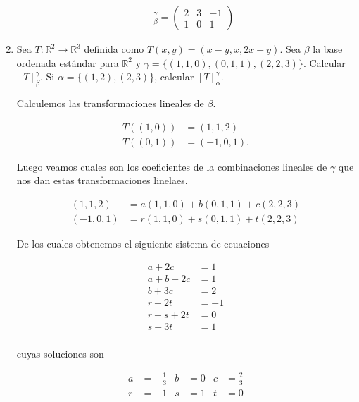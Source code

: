 \documentclass[10pt,a4paper]{article}
\theoremstyle{definition}
\newcommand{\R}{\mathbb{R}}
\begin{document}
\begin{enumerate}
\begin{enumerate}
        \begin{align*}
            [T]^\gamma_\beta = \begin{pmatrix}
                2 & 3 & -1\\
                1 & 0 & 1
            \end{pmatrix}
        \end{align*}
 
    \end{enumerate}

    \item Sea $T : \R^2 \rightarrow \R^3$ definida como $T(x, y) = (x - y, x, 2x + y)$. Sea $\beta$ la base ordenada estándar para $\R^2$ y $\gamma = \{(1, 1, 0),(0, 1, 1),(2, 2, 3)\}$. Calcular $[T]^\gamma_\beta$. Si $\alpha = \{(1, 2),(2, 3)\}$, calcular $[T]^\gamma_\alpha$.
    
    Calculemos las transformaciones lineales de $\beta$.

    \begin{align*}
        T((1,0)) &= (1,1,2)\\
        T((0,1)) &= (-1,0,1).
    \end{align*}
    
    Luego veamos cuales son los coeficientes de la combinaciones lineales de $\gamma$ que nos dan estas transformaciones linelaes.

    \begin{align*}
        (1,1,2) &= a(1,1,0) + b(0,1,1) + c(2,2,3)\\
        (-1,0,1) &= r(1,1,0) + s(0,1,1) + t(2,2,3)
    \end{align*}

    De los cuales obtenemos el siguiente sistema de ecuaciones

    \begin{align*}
        a + 2c &= 1\\
        a + b + 2c &= 1\\
        b + 3c &= 2\\
        r + 2t &= -1\\
        r + s + 2t &= 0\\
        s + 3t &= 1\\
    \end{align*}

    cuyas soluciones son

    \begin{align*}
        a &= -\frac{1}{3} & b &= 0 & c &= \frac{2}{3}\\
        r &= -1 & s &= 1 & t &= 0
    \end{align*}


\end{enumerate}
\end{document}
